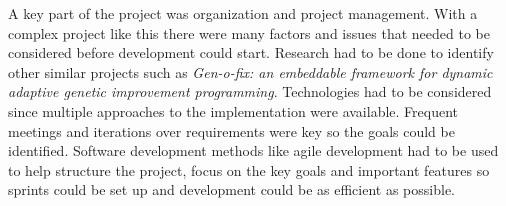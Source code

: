 A key part of the project was organization and project management. With a complex project like this there were many
factors and issues that needed to be considered before development could start. Research had to be done to identify
other similar projects such as \textit{Gen-o-fix: an embeddable framework for dynamic adaptive genetic improvement programming}.
Technologies had to be considered since multiple approaches to the implementation were available. Frequent meetings and 
iterations over requirements were key so the goals could be identified. Software development methods like agile development had to be used to help structure the
project, focus on the key goals and important features so sprints could be set up and development could be as efficient as possible.